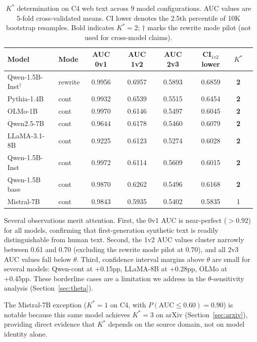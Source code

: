 \documentclass[11pt]{article}
\newcommand{\kstar}{K^*}
\newcommand{\thetaval}{\theta}
\begin{document}
\begin{table}[t]
\centering
\caption{$\kstar$ determination on C4 web text across 9 model configurations. AUC values are 5-fold cross-validated means. CI lower denotes the 2.5th percentile of 10K bootstrap resamples. Bold indicates $\kstar{=}2$; $\dagger$ marks the rewrite mode pilot (not used for cross-model claims).}
\label{tab:c4_main}
\small
\begin{tabular}{llcccccc}
\toprule
Model & Mode & AUC 0v1 & AUC 1v2 & AUC 2v3 & CI$_{1v2}$ lower & $\kstar$ \\
\midrule
Qwen-1.5B-Inst$^\dagger$ & rewrite & 0.9956 & 0.6957 & 0.5893 & 0.6859 & \textbf{2} \\
Pythia-1.4B & cont & 0.9932 & 0.6539 & 0.5515 & 0.6454 & \textbf{2} \\
OLMo-1B & cont & 0.9970 & 0.6146 & 0.5497 & 0.6045 & \textbf{2} \\
Qwen2.5-7B & cont & 0.9644 & 0.6178 & 0.5460 & 0.6079 & \textbf{2} \\
LLaMA-3.1-8B & cont & 0.9225 & 0.6123 & 0.5274 & 0.6028 & \textbf{2} \\
Qwen-1.5B-Inst & cont & 0.9972 & 0.6114 & 0.5609 & 0.6015 & \textbf{2} \\
Qwen-1.5B base & cont & 0.9870 & 0.6262 & 0.5496 & 0.6168 & \textbf{2} \\
\midrule
Mistral-7B & cont & 0.9843 & 0.5935 & 0.5402 & 0.5835 & 1 \\
\bottomrule
\end{tabular}
\end{table}

Several observations merit attention. First, the 0v1 AUC is near-perfect ($>0.92$) for all models, confirming that first-generation synthetic text is readily distinguishable from human text. Second, the 1v2 AUC values cluster narrowly between 0.61 and 0.70 (excluding the rewrite mode pilot at 0.70), and all 2v3 AUC values fall below $\thetaval$. Third, confidence interval margins above $\thetaval$ are small for several models: Qwen-cont at +0.15pp, LLaMA-8B at +0.28pp, OLMo at +0.45pp. These borderline cases are a limitation we address in the $\thetaval$-sensitivity analysis (Section~\ref{sec:theta}).

The Mistral-7B exception ($\kstar{=}1$ on C4, with $P(\text{AUC} \leq 0.60) = 0.90$) is notable because this same model achieves $\kstar{=}3$ on arXiv (Section~\ref{sec:arxiv}), providing direct evidence that $\kstar$ depends on the source domain, not on model identity alone.
\end{document}
